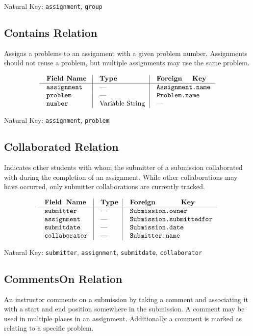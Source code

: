 {\noindent
Natural Key: {\tt assignment}, {\tt group}\par}

\subsection{Contains Relation}
Assigns a problems to an assignment with a given problem number.
Assignments should not reuse a problem,
but multiple assignments may use the same problem.

$$\vbox{
  \offinterlineskip
  \halign{
    \strut \quad {\tt #}  & \vrule\quad #  & \vrule\quad # \cr
    {\bf Field Name}  & {\bf Type}  & {\bf Foreign Key}\cr
    \noalign{\hrule}    
    assignment  & ---  & {\tt Assignment.name} \cr
    problem  & ---  & {\tt Problem.name} \cr
    number  & Variable String  & --- \cr
  }
}$$

{\noindent
Natural Key: {\tt assignment}, {\tt problem}\par}

\subsection{Collaborated Relation}
Indicates other students with whom the submitter of a submission
collaborated with during the completion of an assignment.
While other collaborations may have occurred, only submitter 
collaborations are currently tracked.

$$\vbox{
  \offinterlineskip
  \halign{
    \strut \quad {\tt #}  & \vrule\quad #  & \vrule\quad # \cr
    {\bf Field Name}  & {\bf Type}  & {\bf Foreign Key}\cr
    \noalign{\hrule}    
    submitter  & ---  & {\tt Submission.owner} \cr
    assignment  & ---  & {\tt Submission.submittedfor} \cr
    submitdate  & ---  & {\tt Submission.date} \cr
    collaborator  & ---  & {\tt Submitter.name} \cr
  }
}$$

{\noindent
Natural Key: {\tt submitter}, {\tt assignment}, {\tt submitdate}, {\tt collaborator}\par}

\subsection{CommentsOn Relation}
An instructor comments on a submission by taking a comment 
and associating it with a start and end position somewhere in the submission. 
A comment may be used in multiple places in an assignment. 
Additionally a comment is marked as relating to a specific problem.

